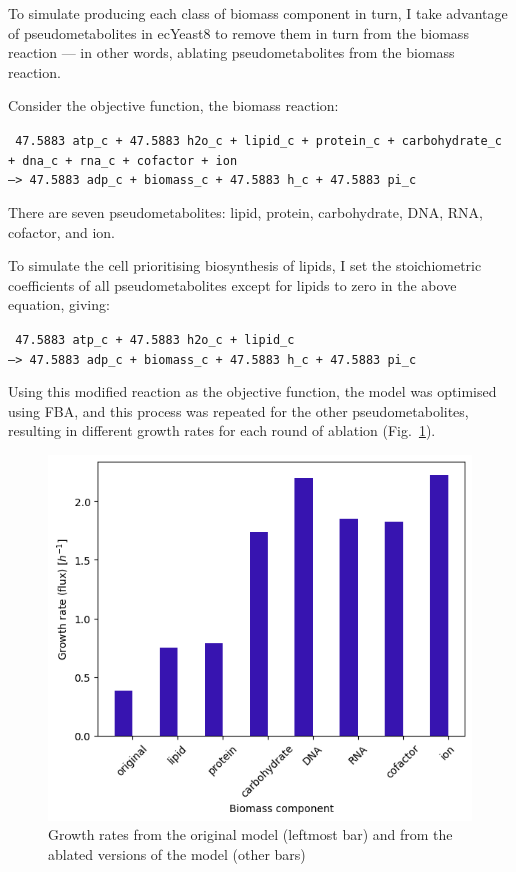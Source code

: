 To simulate producing each class of biomass component in turn,
I take advantage of pseudometabolites in ecYeast8 to remove them in turn from the biomass reaction ---
in other words, ablating pseudometabolites from the biomass reaction.

Consider the objective function, the biomass reaction:

\texttt{
  47.5883 atp\_c + 47.5883 h2o\_c + lipid\_c + protein\_c + carbohydrate\_c\\
  + dna\_c + rna\_c + cofactor + ion \\
  --> 47.5883 adp\_c + biomass\_c + 47.5883 h\_c + 47.5883 pi\_c
}

There are seven pseudometabolites: lipid, protein, carbohydrate, DNA, RNA, cofactor, and ion.

To simulate the cell prioritising biosynthesis of lipids, I set the stoichiometric coefficients of all pseudometabolites except for lipids to zero in the above equation, giving:

\texttt{
  47.5883 atp\_c + 47.5883 h2o\_c + lipid\_c \\
  --> 47.5883 adp\_c + biomass\_c + 47.5883 h\_c + 47.5883 pi\_c
}

Using this modified reaction as the objective function, the model was optimised using FBA, and
this process was repeated for the other pseudometabolites, resulting in different growth rates for each round of ablation (Fig.\ \ref{fig:model-ablate-fluxes}).

\begin{figure}
  \centering
  \includegraphics[width=.6\linewidth]{ablation_example_fluxes.png}
  \caption[
    Growth rates from the original model and from the ablated versions of the model
  ]{
    Growth rates from the original model (leftmost bar) and from the ablated versions of the model (other bars)
  }
  \label{fig:model-ablate-fluxes}
\end{figure}


